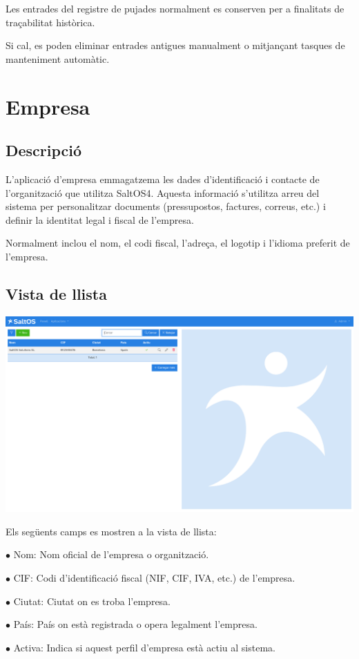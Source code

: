 \documentclass[a4paper]{article}
\begin{document}
Les entrades del registre de pujades normalment es conserven per a finalitats de traçabilitat històrica.

Si cal, es poden eliminar entrades antigues manualment o mitjançant tasques de manteniment automàtic.


\hypertarget{toc41}{}
\section{Empresa}

\hypertarget{toc42}{}
\subsection{Descripció}

L'aplicació d'empresa emmagatzema les dades d'identificació i contacte de l'organització que utilitza SaltOS4.
Aquesta informació s'utilitza arreu del sistema per personalitzar documents (pressupostos, factures, correus, etc.) i definir la identitat legal i fiscal de l'empresa.

Normalment inclou el nom, el codi fiscal, l'adreça, el logotip i l'idioma preferit de l'empresa.

\hypertarget{toc43}{}
\subsection{Vista de llista}

\begin{center}\includegraphics[width=1\textwidth]{../ujest/snaps/test-screenshots-js-screenshots-company-company-list-ca-es-1-snap.png}\end{center}

Els següents camps es mostren a la vista de llista:

\begin{compactitem}
\item[\color{myblue}$\bullet$] Nom: Nom oficial de l'empresa o organització.
\item[\color{myblue}$\bullet$] CIF: Codi d'identificació fiscal (NIF, CIF, IVA, etc.) de l'empresa.
\item[\color{myblue}$\bullet$] Ciutat: Ciutat on es troba l'empresa.
\item[\color{myblue}$\bullet$] País: País on està registrada o opera legalment l'empresa.
\item[\color{myblue}$\bullet$] Activa: Indica si aquest perfil d'empresa està actiu al sistema.
\end{compactitem}
\end{document}
